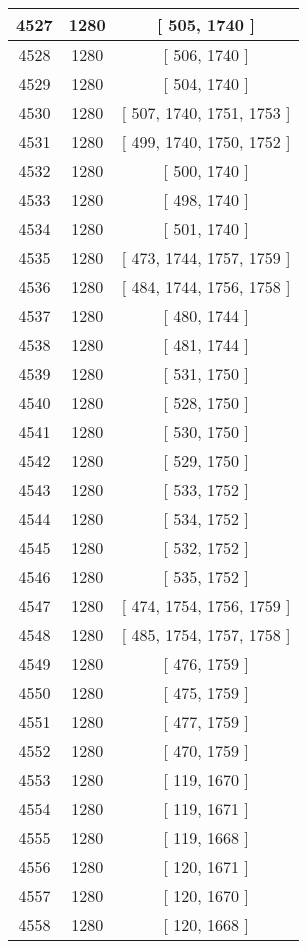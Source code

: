 \begin{center}
\begin{longtable}[H]{|| c c c ||}
\hline
4527 & 1280 & [ 505, 1740 ] \\ 
\hline
4528 & 1280 & [ 506, 1740 ] \\ 
\hline
4529 & 1280 & [ 504, 1740 ] \\ 
\hline
4530 & 1280 & [ 507, 1740, 1751, 1753 ] \\ 
\hline
4531 & 1280 & [ 499, 1740, 1750, 1752 ] \\ 
\hline
4532 & 1280 & [ 500, 1740 ] \\ 
\hline
4533 & 1280 & [ 498, 1740 ] \\ 
\hline
4534 & 1280 & [ 501, 1740 ] \\ 
\hline
4535 & 1280 & [ 473, 1744, 1757, 1759 ] \\ 
\hline
4536 & 1280 & [ 484, 1744, 1756, 1758 ] \\ 
\hline
4537 & 1280 & [ 480, 1744 ] \\ 
\hline
4538 & 1280 & [ 481, 1744 ] \\ 
\hline
4539 & 1280 & [ 531, 1750 ] \\ 
\hline
4540 & 1280 & [ 528, 1750 ] \\ 
\hline
4541 & 1280 & [ 530, 1750 ] \\ 
\hline
4542 & 1280 & [ 529, 1750 ] \\ 
\hline
4543 & 1280 & [ 533, 1752 ] \\ 
\hline
4544 & 1280 & [ 534, 1752 ] \\ 
\hline
4545 & 1280 & [ 532, 1752 ] \\ 
\hline
4546 & 1280 & [ 535, 1752 ] \\ 
\hline
4547 & 1280 & [ 474, 1754, 1756, 1759 ] \\ 
\hline
4548 & 1280 & [ 485, 1754, 1757, 1758 ] \\ 
\hline
4549 & 1280 & [ 476, 1759 ] \\ 
\hline
4550 & 1280 & [ 475, 1759 ] \\ 
\hline
4551 & 1280 & [ 477, 1759 ] \\ 
\hline
4552 & 1280 & [ 470, 1759 ] \\ 
\hline
4553 & 1280 & [ 119, 1670 ] \\ 
\hline
4554 & 1280 & [ 119, 1671 ] \\ 
\hline
4555 & 1280 & [ 119, 1668 ] \\ 
\hline
4556 & 1280 & [ 120, 1671 ] \\ 
\hline
4557 & 1280 & [ 120, 1670 ] \\ 
\hline
4558 & 1280 & [ 120, 1668 ] \\ 

\end{longtable}
\end{center}
